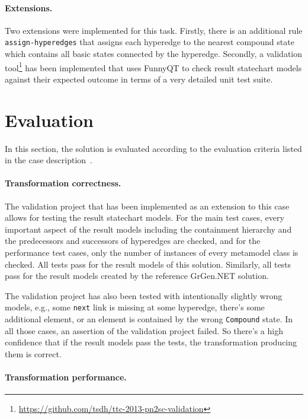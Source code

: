 \documentclass[submission]{eptcs}
\begin{document}
\paragraph{Extensions.}
\label{sec:extensions}

\begin{sloppypar}
  Two extensions were implemented for this task.  Firstly, there is an
  additional rule \verb|assign-hyperedges| that assigns each hyperedge to the
  nearest compound state which contains all basic states connected by the
  hyperedge.  Secondly, a validation
  tool\footnote{\url{https://github.com/tsdh/ttc-2013-pn2sc-validation}} has
  been implemented that uses FunnyQT to check result statechart models against
  their expected outcome in terms of a very detailed unit test suite.
\end{sloppypar}
\section{Evaluation}
\label{sec:evaluation}

In this section, the solution is evaluated according to the evaluation criteria
listed in the case description~\cite{pn2sccasedesc}.

\paragraph{Transformation correctness.}

The validation project that has been implemented as an extension to this case
allows for testing the result statechart models.  For the main test cases,
every important aspect of the result models including the containment hierarchy
and the predecessors and successors of hyperedges are checked, and for the
performance test cases, only the number of instances of every metamodel class
is checked.  All tests pass for the result models of this solution.  Similarly,
all tests pass for the result models created by the reference GrGen.NET
solution.

The validation project has also been tested with intentionally slightly wrong
models, e.g., some \verb|next| link is missing at some hyperedge, there's some
additional element, or an element is contained by the wrong \verb|Compound|
state.  In all those cases, an assertion of the validation project failed.  So
there's a high confidence that if the result models pass the tests, the
transformation producing them is correct.

\paragraph{Transformation performance.}
\end{document}
